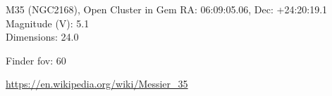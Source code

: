 \begin{block}{M35 (NGC2168), Open Cluster in Gem}
    RA: 06:09:05.06, Dec: +24:20:19.1 \\ 
    Magnitude (V): 5.1 \\ 
    Dimensions: 24.0 

    Finder fov: 60 

    \url{https://en.wikipedia.org/wiki/Messier_35} 
\end{block}